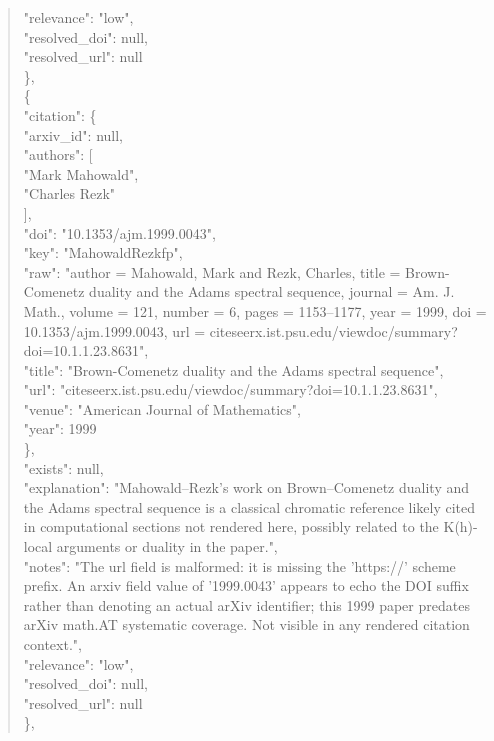 \documentclass[11pt]{article}
\begin{document}
\begin{quote}
      "relevance": "low",\\
      "resolved\_doi": null,\\
      "resolved\_url": null\\
    \},\\
    \{\\
      "citation": \{\\
        "arxiv\_id": null,\\
        "authors": [\\
          "Mark Mahowald",\\
          "Charles Rezk"\\
        ],\\
        "doi": "10.1353/ajm.1999.0043",\\
        "key": "MahowaldRezkfp",\\
        "raw": "author = Mahowald, Mark and Rezk, Charles, title = Brown-Comenetz duality and the Adams spectral sequence, journal = Am. J. Math., volume = 121, number = 6, pages = 1153--1177, year = 1999, doi = 10.1353/ajm.1999.0043, url = citeseerx.ist.psu.edu/viewdoc/summary?doi=10.1.1.23.8631",\\
        "title": "Brown-Comenetz duality and the Adams spectral sequence",\\
        "url": "citeseerx.ist.psu.edu/viewdoc/summary?doi=10.1.1.23.8631",\\
        "venue": "American Journal of Mathematics",\\
        "year": 1999\\
      \},\\
      "exists": null,\\
      "explanation": "Mahowald--Rezk's work on Brown--Comenetz duality and the Adams spectral sequence is a classical chromatic reference likely cited in computational sections not rendered here, possibly related to the K(h)-local arguments or duality in the paper.",\\
      "notes": "The url field is malformed: it is missing the 'https://' scheme prefix. An arxiv field value of '1999.0043' appears to echo the DOI suffix rather than denoting an actual arXiv identifier; this 1999 paper predates arXiv math.AT systematic coverage. Not visible in any rendered citation context.",\\
      "relevance": "low",\\
      "resolved\_doi": null,\\
      "resolved\_url": null\\
    \},\\

\end{quote}
\end{document}
